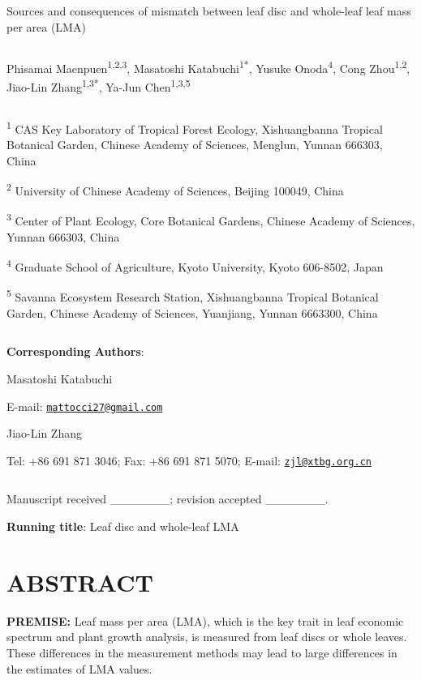 \documentclass[
  12pt,
  a4paper,
,tablecaptionabove
]{scrartcl}
\date{}
\title{}
\author{}
\begin{document}




Sources and consequences of mismatch between leaf disc and whole-leaf
leaf mass per area (LMA)

\[ \]

Phisamai Maenpuen\textsuperscript{1,2,3}, Masatoshi
Katabuchi\textsuperscript{1*}, Yusuke Onoda\textsuperscript{4}, Cong
Zhou\textsuperscript{1,2}, Jiao-Lin Zhang\textsuperscript{1,3*}, Ya-Jun
Chen\textsuperscript{1,3,5}

\[ \]

\textsuperscript{1} CAS Key Laboratory of Tropical Forest Ecology,
Xishuangbanna Tropical Botanical Garden, Chinese Academy of Sciences,
Menglun, Yunnan 666303, China

\textsuperscript{2} University of Chinese Academy of Sciences, Beijing
100049, China

\textsuperscript{3} Center of Plant Ecology, Core Botanical Gardens,
Chinese Academy of Sciences, Yunnan 666303, China

\textsuperscript{4} Graduate School of Agriculture, Kyoto University,
Kyoto 606-8502, Japan

\textsuperscript{5} Savanna Ecosystem Research Station, Xishuangbanna
Tropical Botanical Garden, Chinese Academy of Sciences, Yuanjiang,
Yunnan 6663300, China

\[ \]

\textbf{Corresponding Authors}:

Masatoshi Katabuchi

E-mail:
\href{mailto:mattocci27@gmail.com}{\nolinkurl{mattocci27@gmail.com}}

Jiao-Lin Zhang

Tel: +86 691 871 3046; Fax: +86 691 871 5070; E-mail:
\href{mailto:zjl@xtbg.org.cn}{\nolinkurl{zjl@xtbg.org.cn}}

\[ \]

Manuscript received \_\_\_\_\_\_\_; revision accepted \_\_\_\_\_\_\_.

\textbf{Running title}: Leaf disc and whole-leaf LMA

\newpage

\hypertarget{abstract}{%
\section{ABSTRACT}\label{abstract}}

\textbf{PREMISE:} Leaf mass per area (LMA), which is the key trait in
leaf economic spectrum and plant growth analysis, is measured from leaf
discs or whole leaves. These differences in the measurement methods may
lead to large differences in the estimates of LMA values.
\end{document}
